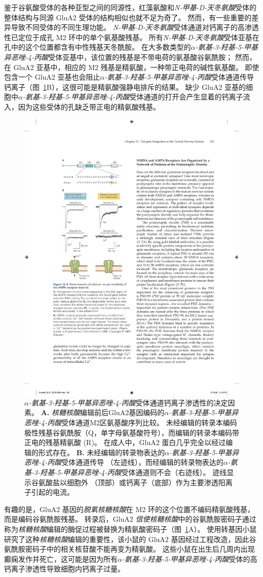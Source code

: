 鉴于谷氨酸受体的各种亚型之间的同源性，红藻氨酸和\textit{N-甲基-D-天冬氨酸}受体的整体结构与同源 GluA2 受体的结构相似也就不足为奇了。
然而，有一些重要的差异导致不同受体的不同生理功能。 
\textit{N-甲基-D-天冬氨酸}受体通道对钙离子的高渗透性已定位于成孔 M2 环中的单个氨基酸残基。
所有\textit{N-甲基-D-天冬氨酸}受体亚基在孔中的这个位置都含有中性残基天冬酰胺。
在大多数类型的\textit{$\alpha$-氨基-3-羟基-5-甲基异恶唑-4-丙酸}受体亚基中，该位置的残基是不带电荷的氨基酸谷氨酰胺；
然而，在 GluA2 亚基中，相应的 M2 残基是精氨酸，一种带正电荷的碱性氨基酸。
即使包含一个 GluA2 亚基也会阻止\textit{$\alpha$-氨基-3-羟基-5-甲基异恶唑-4-丙酸}受体通道传导钙离子（图~\ref{fig:13_6}B），这很可能是精氨酸强静电排斥的结果。
缺少 GluA2 亚基的细胞中\textit{$\alpha$-氨基-3-羟基-5-甲基异恶唑-4-丙酸}受体通道的打开会产生显着的钙离子流入，因为这些受体的孔缺乏带正电的精氨酸残基。


\begin{figure}[htbp]
	\centering
	\includegraphics[width=0.45\linewidth]{chap13/fig_13_6}
	\caption{\textit{$\alpha$-氨基-3-羟基-5-甲基异恶唑-4-丙酸}受体通道钙离子渗透性的决定因素。
		\textbf{A.} \textit{核糖核酸}编辑前后GluA2基因编码的\textit{$\alpha$-氨基-3-羟基-5-甲基异恶唑-4-丙酸}受体通道M2区氨基酸序列比较。
		未经编辑的转录本编码极性残基谷氨酰胺（Q，单字母氨基酸符号），而编辑的转录本编码带正电的残基精氨酸 (R)。
		在成人中，GluA2 蛋白几乎完全以经过编辑的形式存在。
		\textbf{B.} 未经编辑的转录物表达的\textit{$\alpha$-氨基-3-羟基-5-甲基异恶唑-4-丙酸}受体通道传导 （左迹线），而经编辑的转录物表达的\textit{$\alpha$-氨基-3-羟基-5-甲基异恶唑-4-丙酸}受体通道则不会（右迹线）。
		迹线显示谷氨酸盐以细胞外 （顶部）或钙离子（底部）作为主要渗透阳离子引起的电流\cite{sakmann1992nobel}。}
	\label{fig:13_6}
\end{figure}


有趣的是，GluA2 基因的\textit{脱氧核糖核酸}在 M2 环的这个位置不编码精氨酸残基，而是编码谷氨酰胺残基。
转录后，GluA2 \textit{信使核糖核酸}中的谷氨酰胺密码子通过称为\textit{核糖核酸}编辑的酶促过程被替换为精氨酸密码子（图~\ref{fig:13_6}A）。
使用转基因小鼠研究了这种\textit{核糖核酸}编辑的重要性，该小鼠的 GluA2 基因经过工程改造，因此谷氨酰胺密码子中的相关核苷酸不能再变为精氨酸。
这些小鼠在出生后几周内出现癫痫发作并死亡，这可能是因为所有\textit{$\alpha$-氨基-3-羟基-5-甲基异恶唑-4-丙酸}受体的高钙离子渗透性导致细胞内钙离子过量。



